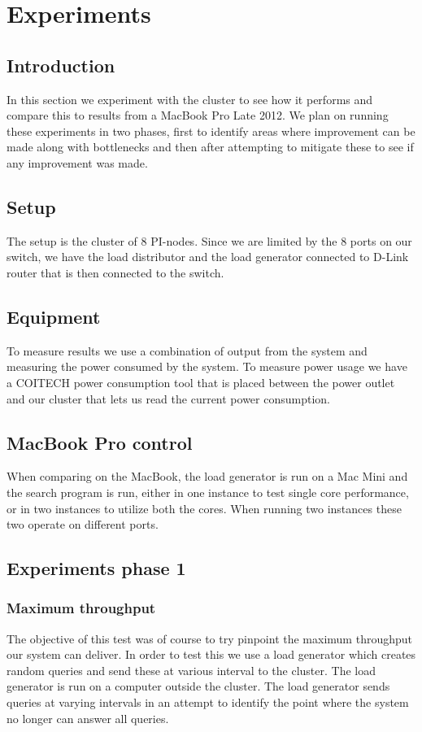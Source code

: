 
\clearpage
\section{Experiments}

\subsection{Introduction}
In this section we experiment with the cluster to see how it performs and compare this to results from a MacBook Pro Late 2012. We plan on running these experiments in two phases, first to identify areas where improvement can be made along with bottlenecks and then after attempting to mitigate these to see if any improvement was made.

\subsection{Setup}
The setup is the cluster of 8 PI-nodes. Since we are limited by the 8 ports on our switch, we have the load distributor and the load generator connected to D-Link router that is then connected to the switch. 

\subsection{Equipment}
To measure results we use a combination of output from the system and measuring the power consumed by the system. To measure power usage we have a COITECH power consumption tool that is placed between the power outlet and our cluster that lets us read the current power consumption.

\subsection{MacBook Pro control}
When comparing on the MacBook, the load generator is run on a Mac Mini and the search program is run, either in one instance to test single core performance, or in two instances to utilize both the cores. When running two instances these two operate on different ports.  

\subsection{Experiments phase 1}

\subsubsection{Maximum throughput} 
The objective of this test was of course to try pinpoint the maximum throughput our system can deliver. In order to test this we use a load generator which creates random queries and send these at various interval to the cluster. The load generator is run on a computer outside the cluster. The load generator sends queries at varying intervals in an attempt to identify the point where the system no longer can answer all queries.   

